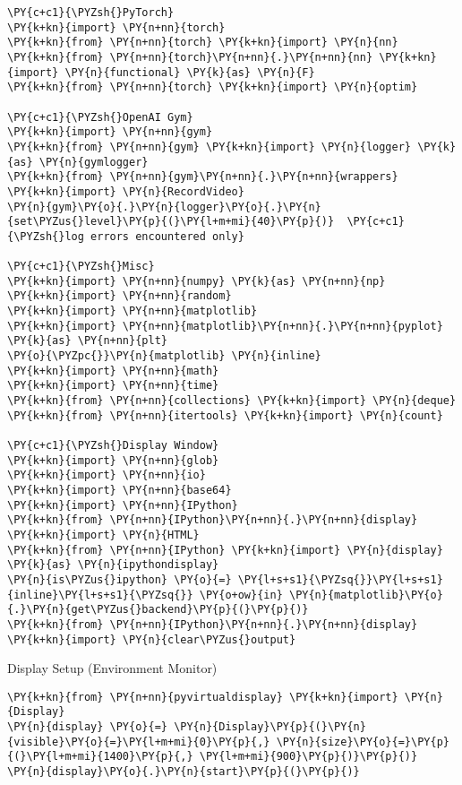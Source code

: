     \begin{tcolorbox}[breakable, size=fbox, boxrule=1pt, pad at break*=1mm,colback=cellbackground, colframe=cellborder]
\begin{Verbatim}[commandchars=\\\{\}]
\PY{c+c1}{\PYZsh{}PyTorch}
\PY{k+kn}{import} \PY{n+nn}{torch}
\PY{k+kn}{from} \PY{n+nn}{torch} \PY{k+kn}{import} \PY{n}{nn}
\PY{k+kn}{from} \PY{n+nn}{torch}\PY{n+nn}{.}\PY{n+nn}{nn} \PY{k+kn}{import} \PY{n}{functional} \PY{k}{as} \PY{n}{F}
\PY{k+kn}{from} \PY{n+nn}{torch} \PY{k+kn}{import} \PY{n}{optim}

\PY{c+c1}{\PYZsh{}OpenAI Gym}
\PY{k+kn}{import} \PY{n+nn}{gym}
\PY{k+kn}{from} \PY{n+nn}{gym} \PY{k+kn}{import} \PY{n}{logger} \PY{k}{as} \PY{n}{gymlogger}
\PY{k+kn}{from} \PY{n+nn}{gym}\PY{n+nn}{.}\PY{n+nn}{wrappers} \PY{k+kn}{import} \PY{n}{RecordVideo}
\PY{n}{gym}\PY{o}{.}\PY{n}{logger}\PY{o}{.}\PY{n}{set\PYZus{}level}\PY{p}{(}\PY{l+m+mi}{40}\PY{p}{)}  \PY{c+c1}{\PYZsh{}log errors encountered only}

\PY{c+c1}{\PYZsh{}Misc}
\PY{k+kn}{import} \PY{n+nn}{numpy} \PY{k}{as} \PY{n+nn}{np}
\PY{k+kn}{import} \PY{n+nn}{random}
\PY{k+kn}{import} \PY{n+nn}{matplotlib}
\PY{k+kn}{import} \PY{n+nn}{matplotlib}\PY{n+nn}{.}\PY{n+nn}{pyplot} \PY{k}{as} \PY{n+nn}{plt}
\PY{o}{\PYZpc{}}\PY{n}{matplotlib} \PY{n}{inline}
\PY{k+kn}{import} \PY{n+nn}{math}
\PY{k+kn}{import} \PY{n+nn}{time}
\PY{k+kn}{from} \PY{n+nn}{collections} \PY{k+kn}{import} \PY{n}{deque}
\PY{k+kn}{from} \PY{n+nn}{itertools} \PY{k+kn}{import} \PY{n}{count}

\PY{c+c1}{\PYZsh{}Display Window}
\PY{k+kn}{import} \PY{n+nn}{glob}
\PY{k+kn}{import} \PY{n+nn}{io}
\PY{k+kn}{import} \PY{n+nn}{base64}
\PY{k+kn}{import} \PY{n+nn}{IPython}
\PY{k+kn}{from} \PY{n+nn}{IPython}\PY{n+nn}{.}\PY{n+nn}{display} \PY{k+kn}{import} \PY{n}{HTML}
\PY{k+kn}{from} \PY{n+nn}{IPython} \PY{k+kn}{import} \PY{n}{display} \PY{k}{as} \PY{n}{ipythondisplay}
\PY{n}{is\PYZus{}ipython} \PY{o}{=} \PY{l+s+s1}{\PYZsq{}}\PY{l+s+s1}{inline}\PY{l+s+s1}{\PYZsq{}} \PY{o+ow}{in} \PY{n}{matplotlib}\PY{o}{.}\PY{n}{get\PYZus{}backend}\PY{p}{(}\PY{p}{)}
\PY{k+kn}{from} \PY{n+nn}{IPython}\PY{n+nn}{.}\PY{n+nn}{display} \PY{k+kn}{import} \PY{n}{clear\PYZus{}output}
\end{Verbatim}
\end{tcolorbox}

    Display Setup (Environment Monitor)

    \begin{tcolorbox}[breakable, size=fbox, boxrule=1pt, pad at break*=1mm,colback=cellbackground, colframe=cellborder]
\begin{Verbatim}[commandchars=\\\{\}]
\PY{k+kn}{from} \PY{n+nn}{pyvirtualdisplay} \PY{k+kn}{import} \PY{n}{Display}
\PY{n}{display} \PY{o}{=} \PY{n}{Display}\PY{p}{(}\PY{n}{visible}\PY{o}{=}\PY{l+m+mi}{0}\PY{p}{,} \PY{n}{size}\PY{o}{=}\PY{p}{(}\PY{l+m+mi}{1400}\PY{p}{,} \PY{l+m+mi}{900}\PY{p}{)}\PY{p}{)}
\PY{n}{display}\PY{o}{.}\PY{n}{start}\PY{p}{(}\PY{p}{)}
\end{Verbatim}
\end{tcolorbox}

